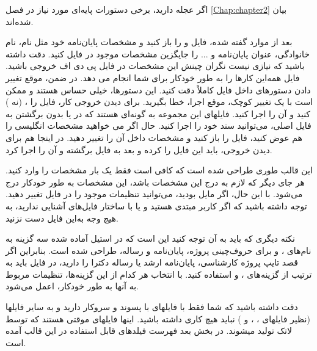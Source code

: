 اگر عجله دارید، برخی دستورات پایه‌ای مورد نیاز در فصل \ref{Chap:chapter2} بیان شده‌اند.
 
 
بعد از موارد گفته شده، فایل 
و
را باز کنید و مشخصات پایان‌نامه خود مثل نام، نام خانوادگی، عنوان پایان‌نامه و ... را جایگزین مشخصات موجود در فایل
 کنید. دقت داشته باشید که نیازی نیست 
نگران چینش این مشخصات در فایل پی دی اف خروجی باشید. فایل 
همه‌این کارها را به طور خودکار برای شما انجام می دهد. در ضمن، موقع تغییر دادن دستورهای داخل فایل
 کاملاً دقت کنید. این دستورها، خیلی حساس هستند و ممکن است با یک تغییر کوچک، موقع اجرا، خطا بگیرید. برای دیدن خروجی کار، فایل 
 را 
، 
(نه 
)
کنید  و آن را اجرا کنید.
 فایلهای این مجموعه به گونه‌ای هستند که در   یا 
بدون برگشتن به فایل اصلی، می‌توانید سند خود را اجرا کنید. 
 حال اگر می خواهید مشخصات انگلیسی \پ را هم عوض کنید، فایل 
را باز کنید و مشخصات داخل آن را تغییر دهید.%
 در اینجا هم برای دیدن خروجی، باید این فایل را 
کرده و بعد به فایل 
برگشته و آن را اجرا کرد.

این قالب طوری طراحی شده است که کافی است فقط  یک بار مشخصات \پ  را وارد کنید. هر جای دیگر که لازم به درج این مشخصات باشد، این مشخصات به طور خودکار درج می‌شود. با این حال، اگر مایل بودید، می‌توانید تنظیمات موجود را در فایل
  تغییر دهید. توجه داشته باشید که اگر کاربر مبتدی هستید و یا با ساختار فایل‌های  
 آشنایی ندارید، به هیچ وجه به‌این فایل دست نزنید.

نکته دیگری که باید به آن توجه کنید این است که در استیل آماده شده سه گزینه به نام‌های
،
و
برای حروف‌چینی پروژه، پایان‌نامه و رساله،
طراحی شده است. بنابراین اگر قصد تایپ پروژه کارشناسی، پایان‌نامه  ارشد یا رساله دکترا را دارید، 
 در فایل 
باید به ترتیب از گزینه‌های
،
و
استفاده کنید. با انتخاب هر کدام از این گزینه‌ها، تنظیمات مربوط به آنها به طور خودکار، اعمل می‌شود.    

دقت داشته باشید که شما فقط با فایلهای با پسوند 
 و 
سروکار دارید و به سایر فایلها (نظیر فایلهای
، ،  و 
)
نباید هیچ کاری داشته باشید. اینها فایلهای موقتی هستند که توسط لاتک تولید میشوند.
در بخش بعد فهرست فیلدهای قابل استفاده در این قالب آمده است.


